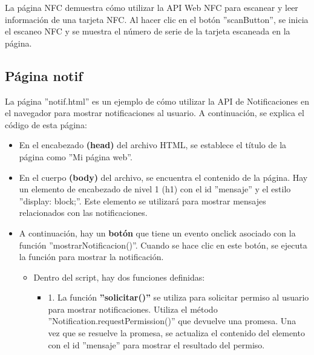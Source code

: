 \documentclass[12pt]{report}
\begin{document}
La página NFC demuestra cómo utilizar la API Web NFC para escanear y leer información de una tarjeta NFC. Al hacer clic en el botón ''scanButton'', se inicia el escaneo NFC y se muestra el número de serie de la tarjeta escaneada en la página.

\subsection{Página notif}
La página ''notif.html'' es un ejemplo de cómo utilizar la API de Notificaciones en el navegador para mostrar notificaciones al usuario. A continuación, se explica el código de esta página:

\begin{itemize}
    \item En el encabezado \textbf{(head)} del archivo HTML, se establece el título de la página como ''Mi página web''.

    \item En el cuerpo \textbf{(body) }del archivo, se encuentra el contenido de la página. Hay un elemento de encabezado de nivel 1 (h1) con el id ''mensaje'' y el estilo ''display: block;''. Este elemento se utilizará para mostrar mensajes relacionados con las notificaciones.

    \item A continuación, hay un \textbf{botón} que tiene un evento onclick asociado con la función ''mostrarNotificacion()''. Cuando se hace clic en este botón, se ejecuta la función para mostrar la notificación.

    \begin{itemize}
        \item Dentro del script, hay dos funciones definidas:
        
        \begin{itemize}
            \item 1. La función \textbf{''solicitar()''} se utiliza para solicitar permiso al usuario para mostrar notificaciones. Utiliza el método ''Notification.requestPermission()'' que devuelve una promesa. Una vez que se resuelve la promesa, se actualiza el contenido del elemento con el id ''mensaje'' para mostrar el resultado del permiso.
            

\end{itemize}
\end{itemize}
\end{itemize}
\end{document}
